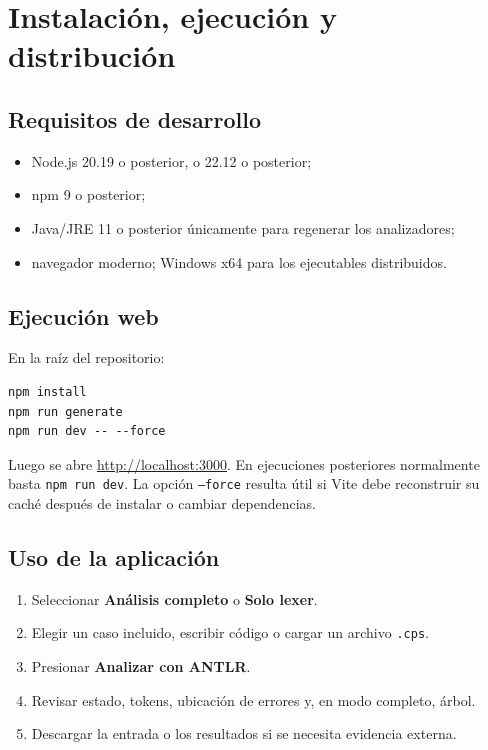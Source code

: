 \documentclass[12pt,letterpaper,oneside]{report}
\newcommand{\archivo}[1]{\texttt{#1}}
\newcommand{\cps}{\texttt{.cps}}
\begin{document}
\chapter{Instalación, ejecución y distribución}

\section{Requisitos de desarrollo}

\begin{itemize}
  \item Node.js 20.19 o posterior, o 22.12 o posterior;
  \item npm 9 o posterior;
  \item Java/JRE 11 o posterior únicamente para regenerar los analizadores;
  \item navegador moderno; Windows x64 para los ejecutables distribuidos.
\end{itemize}

\section{Ejecución web}

En la raíz del repositorio:

\begin{verbatim}
npm install
npm run generate
npm run dev -- --force
\end{verbatim}

Luego se abre \url{http://localhost:3000}. En ejecuciones posteriores normalmente
basta \archivo{npm run dev}. La opción \archivo{--force} resulta útil si Vite debe
reconstruir su caché después de instalar o cambiar dependencias.

\vspace{8cm}

\section{Uso de la aplicación}

\begin{enumerate}
  \item Seleccionar \textbf{Análisis completo} o \textbf{Solo lexer}.
  \item Elegir un caso incluido, escribir código o cargar un archivo \cps.
  \item Presionar \textbf{Analizar con ANTLR}.
  \item Revisar estado, tokens, ubicación de errores y, en modo completo, árbol.
  \item Descargar la entrada o los resultados si se necesita evidencia externa.
\end{enumerate}
\end{document}
